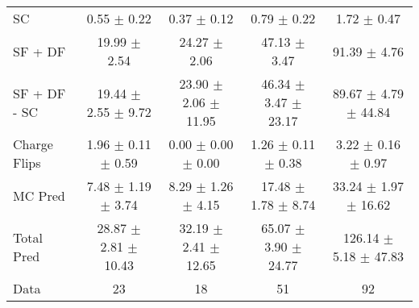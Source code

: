 \begin{tabular}{l|cccc}
                                 SC &  0.55 $\pm$  0.22 &  0.37 $\pm$  0.12 &  0.79 $\pm$  0.22 &  1.72 $\pm$  0.47 \\
                            SF + DF & 19.99 $\pm$  2.54 & 24.27 $\pm$  2.06 & 47.13 $\pm$  3.47 & 91.39 $\pm$  4.76 \\
\hline
                       SF + DF - SC & 19.44 $\pm$  2.55 $\pm$  9.72 & 23.90 $\pm$  2.06 $\pm$ 11.95 & 46.34 $\pm$  3.47 $\pm$ 23.17 & 89.67 $\pm$  4.79 $\pm$ 44.84 \\
\hline\hline
                       Charge Flips &  1.96 $\pm$  0.11 $\pm$  0.59 &  0.00 $\pm$  0.00 $\pm$  0.00 &  1.26 $\pm$  0.11 $\pm$  0.38 &  3.22 $\pm$  0.16 $\pm$  0.97 \\
\hline
                            MC Pred &  7.48 $\pm$  1.19 $\pm$  3.74 &  8.29 $\pm$  1.26 $\pm$  4.15 & 17.48 $\pm$  1.78 $\pm$  8.74 & 33.24 $\pm$  1.97 $\pm$ 16.62 \\
\hline
                         Total Pred & 28.87 $\pm$  2.81 $\pm$ 10.43 & 32.19 $\pm$  2.41 $\pm$ 12.65 & 65.07 $\pm$  3.90 $\pm$ 24.77 & 126.14 $\pm$  5.18 $\pm$ 47.83 \\
\hline\hline
                               Data &    23 &    18 &    51 &    92 \\
\hline\hline
\end{tabular}

